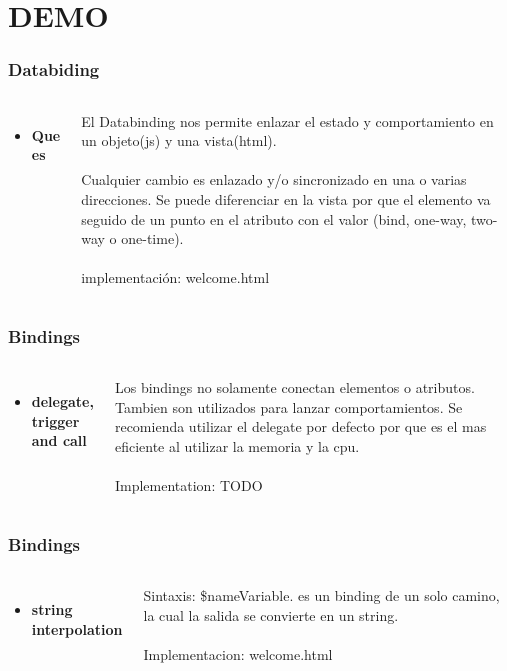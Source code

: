 \documentclass{beamer}
\begin{document}
\section{DEMO}
\begin{frame}
\frametitle{Databiding}
\begin{columns}[c]

\begin{itemize}
\item \textbf{Que es}
\end{itemize}

El Databinding nos permite enlazar el estado y comportamiento en un objeto(js) y una vista(html).
\\~\\
Cualquier cambio es enlazado y/o sincronizado en una o varias direcciones. Se puede diferenciar en la vista por que el elemento va seguido de un punto en el atributo con el valor (bind, one-way, two-way o one-time).
\\~\\
implementación: welcome.html
\end{columns}
\end{frame}
\begin{frame}
\frametitle{Bindings}
\begin{columns}[c]

\begin{itemize}
\item \textbf{delegate, trigger and call}
\end{itemize}

Los bindings no solamente conectan elementos o atributos. Tambien son utilizados para lanzar comportamientos.
Se recomienda utilizar el delegate por defecto por que es el mas eficiente al utilizar la memoria y la cpu.
\\~\\
Implementation: TODO
\end{columns}
\end{frame}
\begin{frame}
\frametitle{Bindings}
\begin{columns}[c]

\begin{itemize}
\item \textbf{string interpolation}
\end{itemize}

Sintaxis: \${nameVariable}. es un binding de un solo camino, la cual la salida se convierte en un string.
\\~\\
Implementacion: welcome.html
\end{columns}
\end{frame}
\end{document}
